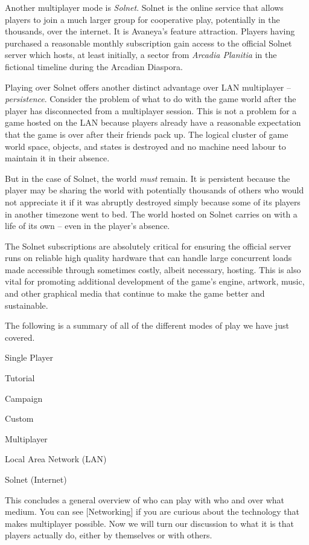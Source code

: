 

Another multiplayer mode is {\it Solnet}. Solnet is the online service that allows players to join a much larger group for cooperative play, potentially in the thousands, over the internet. It is Avaneya's feature attraction. Players having purchased a reasonable monthly subscription gain access to the official Solnet server which hosts, at least initially, a sector from {\it Arcadia Planitia} in the fictional timeline during the Arcadian Diaspora.

Playing over Solnet offers another distinct advantage over LAN multiplayer -- {\it persistence}. Consider the problem of what to do with the game world after the player has disconnected from a multiplayer session. This is not a problem for a game hosted on the LAN because players already have a reasonable expectation that the game is over after their friends pack up. The logical cluster of game world space, objects, and states is destroyed and no machine need labour to maintain it in their absence.

But in the case of Solnet, the world {\it must} remain. It is persistent because the player may be sharing the world with potentially thousands of others who would not appreciate it if it was abruptly destroyed simply because some of its players in another timezone went to bed. The world hosted on Solnet carries on with a life of its own -- even in the player's absence.

The Solnet subscriptions are absolutely critical for ensuring the official server runs on reliable high quality hardware that can handle large concurrent loads made accessible through sometimes costly, albeit necessary, hosting. This is also vital for promoting additional development of the game's engine, artwork, music, and other graphical media that continue to make the game better and sustainable.

The following is a summary of all of the different modes of play we have just covered.

\startitemize[4]
    \item Single Player
        \startitemize[4]
        \item Tutorial
        \item Campaign
        \item Custom
        \stopitemize

    \item Multiplayer
        \startitemize[4]
        \item Local Area Network (LAN)
        \item Solnet (Internet)
        \stopitemize
\stopitemize

This concludes a general overview of who can play with who and over what medium. You can see [Networking] if you are curious about the technology that makes multiplayer possible. Now we will turn our discussion to what it is that players actually do, either by themselves or with others.

